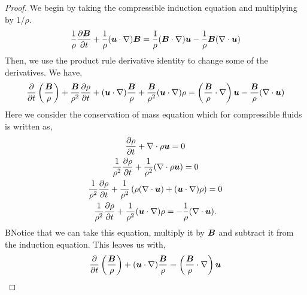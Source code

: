 \documentclass{article}
\begin{document}
\begin{proof}
    We begin by taking the compressible induction equation and multiplying by
    $1/\rho$. 
    \begin{gather*}
        \frac{1}{\rho}\frac{\partial \boldsymbol{B}}{\partial t} + \frac{1}{\rho}(\boldsymbol{u}\cdot\nabla)\boldsymbol{B} =
        \frac{1}{\rho}(\boldsymbol{B}\cdot\nabla)\boldsymbol{u} - \frac{1}{\rho}\boldsymbol{B}(\nabla \cdot{\boldsymbol{u}})
    \end{gather*}
    Then, we use the product rule derivative identity to change some of the
    derivatives. We have,
    \begin{gather*}
        \frac{\partial }{\partial t}\left(\frac{\boldsymbol{B}}{\rho}\right) + \frac{\boldsymbol{B}}{\rho^2}\frac{\partial \rho}{\partial t} + 
        (\boldsymbol{u}\cdot\nabla)\frac{\boldsymbol{B}}{\rho} + 
        \frac{\boldsymbol{B}}{\rho^2}(\boldsymbol{u}\cdot\nabla)\rho =
        \left(\frac{\boldsymbol{B}}{\rho}\cdot\nabla\right)\boldsymbol{u} -
        \frac{\boldsymbol{B}}{\rho}(\nabla \cdot{\boldsymbol{u}})
    \end{gather*}
    Here we consider the conservation of mass equation which for compressible
    fluids is written as,
    \begin{gather*}
        \frac{\partial \rho}{\partial t} + \nabla \cdot{\rho\boldsymbol{u}} = 0\\
        \frac{1}{\rho^2}\frac{\partial \rho}{\partial t} + \frac{1}{\rho^2}(\nabla \cdot{\rho\boldsymbol{u}}) = 0\\
        \frac{1}{\rho^2}\frac{\partial \rho}{\partial t} + \frac{1}{\rho^2}\left(\rho(\nabla \cdot{\boldsymbol{u}}) +
        (\boldsymbol{u}\cdot\nabla)\rho\right) = 0\\
        \frac{1}{\rho^2}\frac{\partial \rho}{\partial t} + \frac{1}{\rho^2}
        (\boldsymbol{u}\cdot\nabla)\rho = -\frac{1}{\rho}(\nabla \cdot{\boldsymbol{u}}).
    \end{gather*}
    BNotice that we can take this equation, multiply it by $\boldsymbol{B}$ and subtract it
    from the induction equation. This leaves us with, 
    \begin{gather*}
        \frac{\partial }{\partial t}\left(\frac{\boldsymbol{B}}{\rho}\right) + 
        (\boldsymbol{u}\cdot\nabla)\frac{\boldsymbol{B}}{\rho} =
        \left(\frac{\boldsymbol{B}}{\rho}\cdot\nabla\right)\boldsymbol{u}
    \end{gather*}

\end{proof}

\section{}
\end{document}
